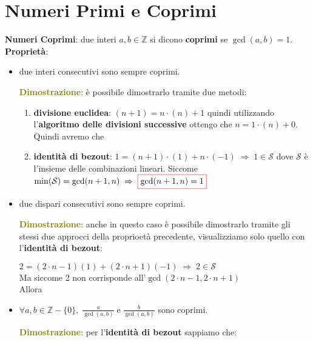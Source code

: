 \section{Numeri Primi e Coprimi}
\textbf{Numeri Coprimi}: due interi $a, b \in \mathbb{Z}$ si dicono \textbf{coprimi} se $\gcd (a, b) = 1$. \\
\textbf{Proprietà}:
\begin{itemize}[nosep]
    \item due interi consecutivi sono sempre coprimi.
    \begin{boxA}
        \textcolor{olive}{\textbf{Dimostrazione}}: è possibile dimostrarlo tramite due metodi:
        \begin{enumerate}[nosep]
            \item \textbf{divisione euclidea}: $(n + 1) = n \cdot (n) + 1$ quindi utilizzando l'\textbf{algoritmo delle divisioni successive} ottengo che $n = 1 \cdot (n) + 0$. Quindi avremo che 
            \item \textbf{identità di bezout}: $1 = (n + 1) \cdot (1) + n \cdot (-1) \; \Rightarrow \; 1 \in \mathcal{S}$ dove $\mathcal{S}$ è l'insieme delle combinazioni lineari. Siccome $\min (\mathcal{S}) = \gcd (n + 1, n) \; \Rightarrow \; \fcolorbox{red}{white}{$\gcd (n + 1, n) = 1$}$
        \end{enumerate}
    \end{boxA}
    \item due dispari consecutivi sono sempre coprimi.
    \begin{boxA}
        \textcolor{olive}{\textbf{Dimostrazione}}: anche in questo caso è possibile dimostrarlo tramite gli stessi due approcci della proprioetà precedente, visualizziamo solo quello con l'\textbf{identità di bezout}:
        
        {\centering
            $2 = (2 \cdot n - 1) (1) + (2 \cdot n + 1) (-1) \; \Rightarrow \; 2 \in \mathcal{S}$ \\
            Ma siccome 2 non corrisponde all'$\gcd (2 \cdot n - 1, 2 \cdot n + 1)$ \\
            Allora 
        \par}
    \end{boxA}
    \item $\forall a, b \in \mathbb{Z} - \{0\}, \; \frac{a}{\gcd (a, b)} \; \text{e} \; \frac{b}{\gcd (a, b)}$ sono coprimi.
    \begin{boxA}
        \textcolor{olive}{\textbf{Dimostrazione}}: per l'\textbf{identità di bezout} sappiamo che:
    

\end{boxA}
\end{itemize}
